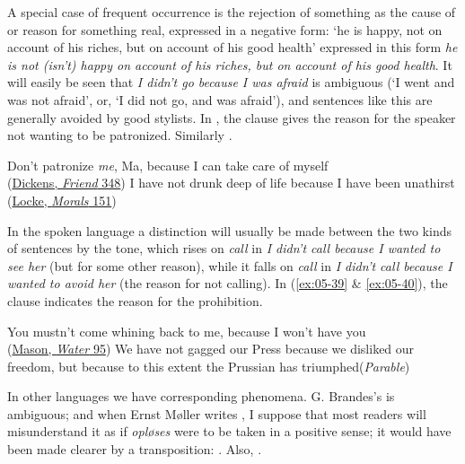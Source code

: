 A special case of frequent occurrence is the rejection of something as the cause of or reason for something real, expressed in a negative form: `he is happy, not on account of his riches, but on account of his good health' expressed in this form \textit{he is not (isn't) happy on account of his riches, but on account of his good health}. It will easily be seen that \textit{I didn't go because I was afraid} is ambiguous (`I went and was not afraid', or, `I did not go, and was afraid'), and sentences like this are generally avoided by good stylists. In , the clause gives the reason for the speaker not wanting to be patronized. Similarly .

\ea \label{ex:05-37}
Don't patronize \textit{me}, Ma, because I can take care of myself \\\hfill(\href{https://archive.org/details/ourmutualfriendc0000char/page/258/mode/2up?q=%22patronise+me%22&view=theater}{Dickens, \textit{Friend} 348}) %
\ex \label{ex:05-38}
I have not drunk deep of life because I have been unathirst\\\hfill(\href{https://archive.org/details/bwb_P8-BLX-259/page/150/mode/2up?view=theater&q=unathirst}{Locke, \textit{Morals} 151})
\z

In the spoken language a distinction will usually be made between the two kinds of sentences by the tone, which rises on \textit{call} in \textit{I didn't call because I wanted to see her} (but for some other reason), while it falls on \textit{call} in \textit{I didn't call because I wanted to avoid her} (the reason for not calling). In (\ref{ex:05-39} \& \ref{ex:05-40}), the clause indicates the reason for the prohibition.

\ea \label{ex:05-39}
You mustn't come whining back to me, because I won't have you\\\hfill(\href{https://archive.org/details/runningwater00masouoft/page/104/mode/2up?q=%22whining+back+to+me%22&view=theater}{Mason, \textit{Water} 95})
\ex\label{ex:05-40}
We have not gagged our Press because we disliked our freedom, but because to this extent the Prussian has triumphed\hfill(\textit{Parable}) %
\z{}

In other languages we have corresponding phenomena. G. Brandes's  is ambiguous; and when Ernst Møller writes , I suppose that most readers will misunderstand it as if \textit{opløses} were to be taken in a positive sense; it would have been made clearer by a transposition: . Also, .

